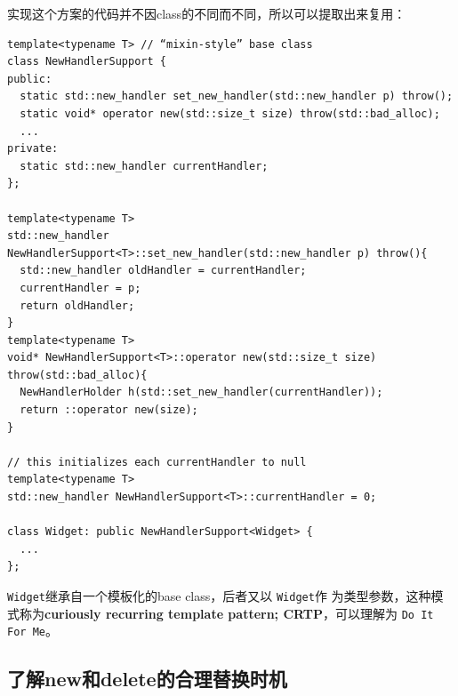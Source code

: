 \documentclass[a4paper,twoside]{article}
\theoremstyle{definition}
\theoremstyle{remark}
\numberwithin{equation}{section}
\let\OldTexttt\texttt
\renewcommand{\texttt}[1]{{\color{blue} \OldTexttt{#1}}}
\begin{document}
实现这个方案的代码并不因class的不同而不同，所以可以提取出来复用：

\begin{verbatim}
template<typename T> // “mixin-style” base class 
class NewHandlerSupport {
public: 
  static std::new_handler set_new_handler(std::new_handler p) throw();
  static void* operator new(std::size_t size) throw(std::bad_alloc);
  ...
private:
  static std::new_handler currentHandler;
};

template<typename T>
std::new_handler NewHandlerSupport<T>::set_new_handler(std::new_handler p) throw(){
  std::new_handler oldHandler = currentHandler;
  currentHandler = p;
  return oldHandler;
}
template<typename T>
void* NewHandlerSupport<T>::operator new(std::size_t size) throw(std::bad_alloc){
  NewHandlerHolder h(std::set_new_handler(currentHandler));
  return ::operator new(size);
}

// this initializes each currentHandler to null
template<typename T>
std::new_handler NewHandlerSupport<T>::currentHandler = 0;

class Widget: public NewHandlerSupport<Widget> {
  ...
};
\end{verbatim}

\texttt{Widget}继承自一个模板化的base class，后者又以\texttt{Widget}作
为类型参数，这种模式称为\textbf{curiously recurring template pattern;
  CRTP}，可以理解为\texttt{Do It For Me}。

\subsection{了解new和delete的合理替换时机}
\label{sec:Item-50}
\end{document}
